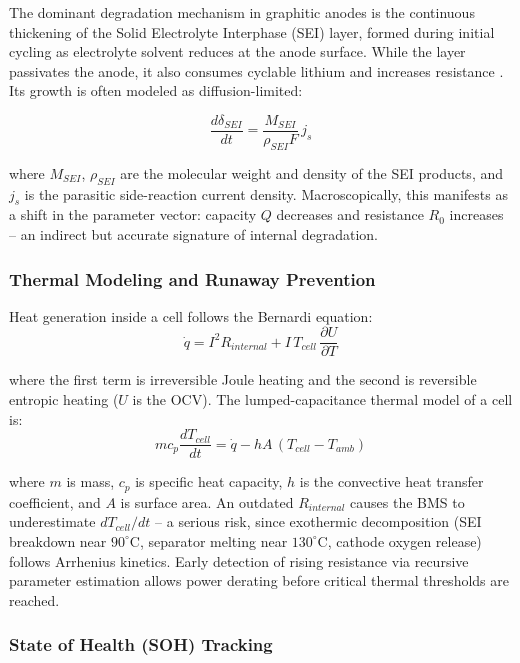 The dominant degradation mechanism in graphitic anodes is the continuous thickening of the Solid Electrolyte Interphase (SEI) layer, formed during initial cycling as electrolyte solvent reduces at the anode surface. While the layer passivates the anode, it also consumes cyclable lithium and increases resistance \cite{vetter2005aging}. Its growth is often modeled as diffusion-limited:

\begin{equation}
\label{eq:sei_growth}
\frac{d\delta_{SEI}}{dt} = \frac{M_{SEI}}{\rho_{SEI} F}\, j_s
\end{equation}

\noindent where $M_{SEI}$, $\rho_{SEI}$ are the molecular weight and density of the SEI products, and $j_s$ is the parasitic side-reaction current density. Macroscopically, this manifests as a shift in the parameter vector: capacity $Q$ decreases and resistance $R_0$ increases -- an indirect but accurate signature of internal degradation.

\subsubsection{Thermal Modeling and Runaway Prevention}

Heat generation inside a cell follows the Bernardi equation:
\begin{equation}
\label{eq:bernardi}
\dot{q} = I^2 R_{internal} + I\, T_{cell}\, \frac{\partial U}{\partial T}
\end{equation}

\noindent where the first term is irreversible Joule heating and the second is reversible entropic heating ($U$ is the OCV). The lumped-capacitance thermal model of a cell is:
\begin{equation}
\label{eq:thermal_mass}
m c_p \frac{dT_{cell}}{dt} = \dot{q} - hA\,(T_{cell} - T_{amb})
\end{equation}

\noindent where $m$ is mass, $c_p$ is specific heat capacity, $h$ is the convective heat transfer coefficient, and $A$ is surface area. An outdated $R_{internal}$ causes the BMS to underestimate $dT_{cell}/dt$ -- a serious risk, since exothermic decomposition (SEI breakdown near $90^\circ$C, separator melting near $130^\circ$C, cathode oxygen release) follows Arrhenius kinetics. Early detection of rising resistance via recursive parameter estimation allows power derating before critical thermal thresholds are reached.

\subsubsection{State of Health (SOH) Tracking}

